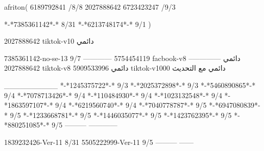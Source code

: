 afriton(
6189792841 /8/8
2027888642
6723423247 /9/3

*-*7385361142*-* 8/31
*-*6213748174*-* 9/1
)

2027888642 tiktok-v10
دائمي


7385361142-no-se-13
9/7
------------
5754454119 facbook-v8
دائمي
--------------
2027888642 tiktok-v8
دائمي
5909533996 tiktok-v1000
دائمي مع التحديث

__________
*-*1245375722*-* 9/3
*-*2025372898*-* 9/3
*-*5460890865*-* 9/4
*-*7078713426*-* 9/4
*-*110484930*-* 9/4
*-*1023132548*-* 9/4
*-*1863597107*-* 9/4
*-*6219560740*-* 9/4
*-*7040778787*-* 9/5
*-*6947080839*-* 9/5
*-*1233668781*-* 9/5
*-*1446035077*-* 9/5
*-*1423762395*-* 9/5
*-*880251085*-* 9/5
---------
------------

1839232426-Ver-11
8/31
5505222999-Ver-11
9/5
---------
------
